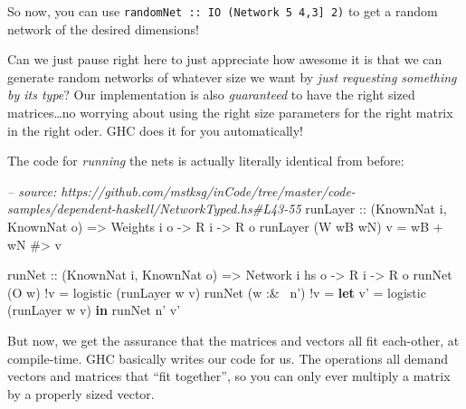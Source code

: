 \documentclass[]{article}
\newenvironment{Shaded}{}{}
\newcommand{\KeywordTok}[1]{\textcolor[rgb]{0.00,0.44,0.13}{\textbf{{#1}}}}
\newcommand{\DataTypeTok}[1]{\textcolor[rgb]{0.56,0.13,0.00}{{#1}}}
\newcommand{\CommentTok}[1]{\textcolor[rgb]{0.38,0.63,0.69}{\textit{{#1}}}}
\newcommand{\OtherTok}[1]{\textcolor[rgb]{0.00,0.44,0.13}{{#1}}}
\newcommand{\FunctionTok}[1]{\textcolor[rgb]{0.02,0.16,0.49}{{#1}}}
\newcommand{\NormalTok}[1]{{#1}}
\begin{document}
So now, you can use
\texttt{randomNet\ ::\ IO\ (Network\ 5\ \textquotesingle{}{[}4,3{]}\ 2)}
to get a random network of the desired dimensions!

Can we just pause right here to just appreciate how awesome it is that
we can generate random networks of whatever size we want by \emph{just
requesting something by its type}? Our implementation is also
\emph{guaranteed} to have the right sized matrices\ldots{}no worrying
about using the right size parameters for the right matrix in the right
oder. GHC does it for you automatically!

The code for \emph{running} the nets is actually literally identical
from before:

\begin{Shaded}
\begin{Highlighting}[]
\CommentTok{-- source: https://github.com/mstksg/inCode/tree/master/code-samples/dependent-haskell/NetworkTyped.hs#L43-55}
\OtherTok{runLayer ::} \NormalTok{(}\DataTypeTok{KnownNat} \NormalTok{i, }\DataTypeTok{KnownNat} \NormalTok{o)}
         \OtherTok{=>} \DataTypeTok{Weights} \NormalTok{i o}
         \OtherTok{->} \DataTypeTok{R} \NormalTok{i}
         \OtherTok{->} \DataTypeTok{R} \NormalTok{o}
\NormalTok{runLayer (}\DataTypeTok{W} \NormalTok{wB wN) v }\FunctionTok{=} \NormalTok{wB }\FunctionTok{+} \NormalTok{wN }\FunctionTok{#>} \NormalTok{v}

\OtherTok{runNet ::} \NormalTok{(}\DataTypeTok{KnownNat} \NormalTok{i, }\DataTypeTok{KnownNat} \NormalTok{o)}
       \OtherTok{=>} \DataTypeTok{Network} \NormalTok{i hs o}
       \OtherTok{->} \DataTypeTok{R} \NormalTok{i}
       \OtherTok{->} \DataTypeTok{R} \NormalTok{o}
\NormalTok{runNet (}\DataTypeTok{O} \NormalTok{w)      }\FunctionTok{!}\NormalTok{v }\FunctionTok{=} \NormalTok{logistic (runLayer w v)}
\NormalTok{runNet (w }\FunctionTok{:&~} \NormalTok{n') }\FunctionTok{!}\NormalTok{v }\FunctionTok{=} \KeywordTok{let} \NormalTok{v' }\FunctionTok{=} \NormalTok{logistic (runLayer w v)}
                       \KeywordTok{in}  \NormalTok{runNet n' v'}
\end{Highlighting}
\end{Shaded}

But now, we get the assurance that the matrices and vectors all fit
each-other, at compile-time. GHC basically writes our code for us. The
operations all demand vectors and matrices that ``fit together'', so you
can only ever multiply a matrix by a properly sized vector.
\end{document}
